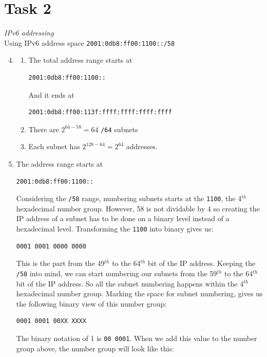 \documentclass[12pt]{article}
\begin{document}
\section{Task 2}
\emph{\large IPv6 addressing} \\[0.3cm]
Using IPv6 address space \verb|2001:0db8:ff00:1100::/58|
\begin{enumerate}
    \setcounter{enumi}{3}
    \item \begin{enumerate}
        \item The total address range starts at
            \begin{verbatim}2001:0db8:ff00:1100::\end{verbatim}
            And it ends at
            \begin{verbatim}2001:0db8:ff00:113f:ffff:ffff:ffff:ffff\end{verbatim}
        \item There are $2^{64-58} = 64$ \verb|/64| subnets
        \item Each subnet has $2^{128-64} = 2^{64}$ addresses.
    \end{enumerate}
    \item The address range starts at
        \begin{verbatim}2001:0db8:ff00:1100::\end{verbatim}
        Considering the \verb|/58| range, numbering subnets starts at the
        \verb|1100|, the 4$^{th}$ hexadecimal number group. However, 58 is
        not dividable by 4 so creating the IP address of a subnet has to be
        done on a binary level instead of a hexadecimal level. Transforming
        the \verb|1100| into binary gives us:
        \begin{verbatim}0001 0001 0000 0000\end{verbatim}
        This is the part from the 49$^{th}$ to the 64$^{th}$ bit of the IP
        address. Keeping the \verb|/58| into mind, we can start numbering
        our subnets from the 59$^{th}$ to the 64$^{th}$ bit of the IP address.
        So all the subnet numbering happens within the 4$^{th}$ hexadecimal
        number group. Marking the space for subnet numbering, gives us the
        following binary view of this number group:
        \begin{verbatim}0001 0001 00XX XXXX\end{verbatim}
        \clearpage
        The binary notation of 1 is \verb|00 0001|. When we add this value
        to the number group above, the number group will look like this:

\end{enumerate}
\end{document}
